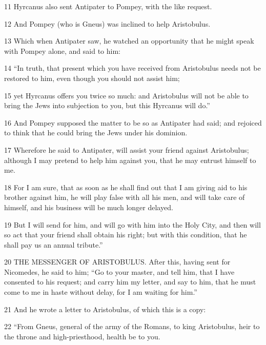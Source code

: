 \par 11 Hyrcanus also sent Antipater to Pompey, with the like request. 

\par 12 And Pompey (who is Gneus) was inclined to help Aristobulus. 

\par 13 Which when Antipater saw, he watched an opportunity that he might speak with Pompey alone, and said to him: 

\par 14 “In truth, that present which you have received from Aristobulus needs not be restored to him, even though you should not assist him; 

\par 15 yet Hyrcanus offers you twice so much: and Aristobulus will not be able to bring the Jews into subjection to you, but this Hyrcanus will do.” 

\par 16 And Pompey supposed the matter to be so as Antipater had said; and rejoiced to think that he could bring the Jews under his dominion. 

\par 17 Wherefore he said to Antipater, will assist your friend against Aristobulus; although I may pretend to help him against you, that he may entrust himself to me. 

\par 18 For I am sure, that as soon as he shall find out that I am giving aid to his brother against him, he will play false with all his men, and will take care of himself, and his business will be much longer delayed. 

\par 19 But I will send for him, and will go with him into the Holy City, and then will so act that your friend shall obtain his right; but with this condition, that he shall pay us an annual tribute.” 

\par 20 THE MESSENGER OF ARISTOBULUS. After this, having sent for Nicomedes, he said to him; “Go to your master, and tell him, that I have consented to his request; and carry him my letter, and say to him, that he must come to me in haste without delay, for I am waiting for him.” 

\par 21 And he wrote a letter to Aristobulus, of which this is a copy: 

\par 22 “From Gneus, general of the army of the Romans, to king Aristobulus, heir to the throne and high-priesthood, health be to you. 

